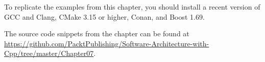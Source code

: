 To replicate the examples from this chapter, you should install a recent version of GCC and Clang, CMake 3.15 or higher, Conan, and Boost 1.69.

The source code snippets from the chapter can be found at \url{https://github.com/PacktPublishing/Software-Architecture-with-Cpp/tree/master/Chapter07}.